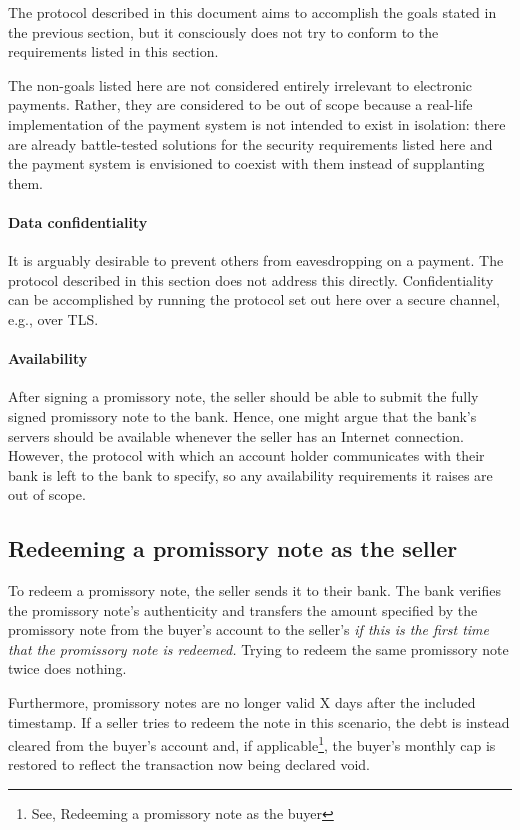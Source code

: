 \documentclass[12pt,a4paper]{article}
\begin{document}
\begin{multicols}{2}
	The protocol described in this document aims to accomplish the goals stated in the previous section, but it consciously does not try to conform to the requirements listed in this section.

	The non-goals listed here are not considered entirely irrelevant to electronic payments. Rather, they are considered to be out of scope because a real-life implementation of the payment system is not intended to exist in isolation: there are already battle-tested solutions for the security requirements listed here and the payment system is envisioned to coexist with them instead of supplanting them.

	\paragraph{Data confidentiality}

	It is arguably desirable to prevent others from eavesdropping on a payment. The protocol described in this section does not address this directly. Confidentiality can be accomplished by running the protocol set out here over a secure channel, e.g., over TLS.

	\paragraph{Availability}

	After signing a promissory note, the seller should be able to submit the fully signed promissory note to the bank. Hence, one might argue that the bank's servers should be available whenever the seller has an Internet connection. However, the protocol with which an account holder communicates with their bank is left to the bank to specify, so any availability requirements it raises are out of scope.

	\subsection{Redeeming a promissory note as the seller}

	To redeem a promissory note, the seller sends it to their bank. The bank verifies the promissory note's authenticity and transfers the amount specified by the promissory note from the buyer's account to the seller's \emph{if this is the first time that the promissory note is redeemed.} Trying to redeem the same promissory note twice does nothing.
	
	Furthermore, promissory notes are no longer valid X days after the included timestamp. If a seller tries to redeem the note in this scenario, the debt is instead cleared from the buyer's account and, if applicable\footnote{See, Redeeming a promissory note as the buyer}, the buyer's monthly cap is restored to reflect the transaction now being declared void.


\end{multicols}
\end{document}
